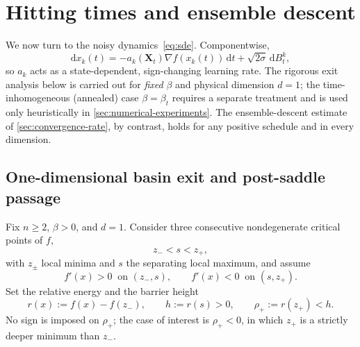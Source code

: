 \documentclass{article}
\newcommand{\dd}{\mathrm d}
\theoremstyle{plain}
\theoremstyle{definition}
\theoremstyle{remark}
\newcommand{\XX}{\mathbf{X}}
\begin{document}
\section{Hitting times and ensemble descent}
\label{sec:hitting-times}

We now turn to the noisy dynamics~\eqref{eq:sde}. Componentwise,
\begin{equation}
    \dd x_k(t)=-a_k(\XX_t)\nabla f(x_k(t))\,\dd t+\sqrt{2\sigma}\,\dd B_t^k,
    \label{eq:softmin-langevin}
\end{equation}
so \(a_k\) acts as a state-dependent, sign-changing learning rate. The rigorous exit analysis below is carried out for \emph{fixed} \(\beta\) and physical dimension \(d=1\); the time-inhomogeneous (annealed) case \(\beta=\beta_t\) requires a separate treatment and is used only heuristically in \ref{sec:numerical-experiments}. The ensemble-descent estimate of \ref{sec:convergence-rate}, by contrast, holds for any positive schedule and in every dimension.

\subsection{One-dimensional basin exit and post-saddle passage}
\label{sec:exit-times}
 
Fix \(n\ge2\), \(\beta>0\), and \(d=1\). Consider three consecutive nondegenerate critical points of \(f\),
\[
    z_-<s<z_+,
\]
with \(z_\pm\) local minima and \(s\) the separating local maximum, and assume
\begin{equation}
    f'(x)>0\ \text{ on }(z_-,s),
    \qquad
    f'(x)<0\ \text{ on }(s,z_+).
    \label{eq:adjacent-well-monotonicity}
\end{equation}
Set the relative energy and the barrier height
\begin{equation}
    r(x):=f(x)-f(z_-), \qquad h:=r(s)>0, \qquad \rho_+:=r(z_+)<h .
    \label{eq:relative-energy}
\end{equation}
No sign is imposed on \(\rho_+\); the case of interest is \(\rho_+<0\), in which \(z_+\) is a strictly deeper minimum than \(z_-\).
 
\end{document}
